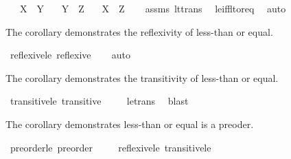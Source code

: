 \begin{isabellebody}
\ \ \ {\isachardoublequoteopen}X\ {\isasymle}\ Y{\isachardoublequoteclose}\isanewline
\ \ \ {\isachardoublequoteopen}Y\ {\isasymle}\ Z{\isachardoublequoteclose}\isanewline
\ \ \ {\isachardoublequoteopen}X\ {\isasymle}\ Z{\isachardoublequoteclose}\isanewline
%
\isadelimproof
\ \ %
\endisadelimproof
%
\isatagproof
{}\isamarkupfalse%
\ assms\ lt{\isacharunderscore}{\kern0pt}trans\ \isamarkupfalse%
\ le{\isacharunderscore}{\kern0pt}iff{\isacharunderscore}{\kern0pt}lt{\isacharunderscore}{\kern0pt}or{\isacharunderscore}{\kern0pt}eq\ \isamarkupfalse%
\ auto%
\endisatagproof
{\isafoldproof}%
%
\isadelimproof
%
\endisadelimproof
%
\begin{isamarkuptext}%
The corollary demonstrates the reflexivity of less-than or equal.%
\end{isamarkuptext}\isamarkuptrue%
\isamarkupfalse%
\ reflexive{\isacharunderscore}{\kern0pt}le{\isacharcolon}{\kern0pt}\ {\isachardoublequoteopen}reflexive\ {\isacharparenleft}{\kern0pt}{\isasymle}{\isacharparenright}{\kern0pt}{\isachardoublequoteclose}%
\isadelimproof
\ %
\endisadelimproof
%
\isatagproof
{}\isamarkupfalse%
\ auto%
\endisatagproof
{\isafoldproof}%
%
\isadelimproof
%
\endisadelimproof
%
\begin{isamarkuptext}%
The corollary demonstrates the transitivity of less-than or equal.%
\end{isamarkuptext}\isamarkuptrue%
\isamarkupfalse%
\ transitive{\isacharunderscore}{\kern0pt}le{\isacharcolon}{\kern0pt}\ {\isachardoublequoteopen}transitive\ {\isacharparenleft}{\kern0pt}{\isasymle}{\isacharparenright}{\kern0pt}{\isachardoublequoteclose}\isanewline
%
\isadelimproof
\ \ %
\endisadelimproof
%
\isatagproof
{}\isamarkupfalse%
\ le{\isacharunderscore}{\kern0pt}trans\ \isamarkupfalse%
\ blast%
\endisatagproof
{\isafoldproof}%
%
\isadelimproof
%
\endisadelimproof
%
\begin{isamarkuptext}%
The corollary demonstrates less-than or equal is a preoder.%
\end{isamarkuptext}\isamarkuptrue%
\isamarkupfalse%
\ preorder{\isacharunderscore}{\kern0pt}le{\isacharcolon}{\kern0pt}\ {\isachardoublequoteopen}preorder\ {\isacharparenleft}{\kern0pt}{\isasymle}{\isacharparenright}{\kern0pt}{\isachardoublequoteclose}\isanewline
%
\isadelimproof
\ \ %
\endisadelimproof
%
\isatagproof
{}\isamarkupfalse%
\ reflexive{\isacharunderscore}{\kern0pt}le\ transitive{\isacharunderscore}{\kern0pt}le\ \isamarkupfalse%

\end{isabellebody}
